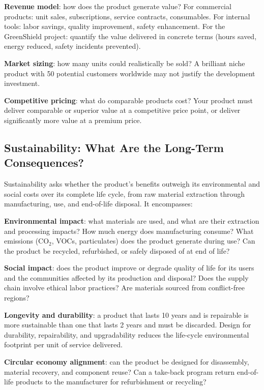 \textbf{Revenue model}: how does the product generate value? For commercial products: unit sales, subscriptions, service contracts, consumables. For internal tools: labor savings, quality improvement, safety enhancement. For the GreenShield project: quantify the value delivered in concrete terms (hours saved, energy reduced, safety incidents prevented).

\textbf{Market sizing}: how many units could realistically be sold? A brilliant niche product with 50 potential customers worldwide may not justify the development investment.

\textbf{Competitive pricing}: what do comparable products cost? Your product must deliver comparable or superior value at a competitive price point, or deliver significantly more value at a premium price.

\subsection{Sustainability: What Are the Long-Term Consequences?}
Sustainability asks whether the product's benefits outweigh its environmental and social costs over its complete life cycle, from raw material extraction through manufacturing, use, and end-of-life disposal. It encompasses:

\textbf{Environmental impact}: what materials are used, and what are their extraction and processing impacts? How much energy does manufacturing consume? What emissions (CO$_2$, VOCs, particulates) does the product generate during use? Can the product be recycled, refurbished, or safely disposed of at end of life?

\textbf{Social impact}: does the product improve or degrade quality of life for its users and the communities affected by its production and disposal? Does the supply chain involve ethical labor practices? Are materials sourced from conflict-free regions?

\textbf{Longevity and durability}: a product that lasts 10 years and is repairable is more sustainable than one that lasts 2 years and must be discarded. Design for durability, repairability, and upgradability reduces the life-cycle environmental footprint per unit of service delivered.

\textbf{Circular economy alignment}: can the product be designed for disassembly, material recovery, and component reuse? Can a take-back program return end-of-life products to the manufacturer for refurbishment or recycling?

